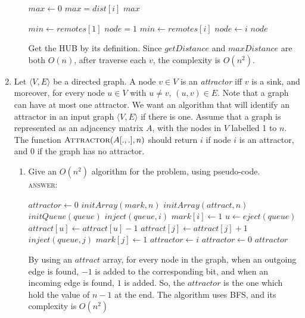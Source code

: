 \documentclass[11pt]{article}
\newcommand{\tuple}[1]{\langle #1 \rangle}
\begin{document}
\begin{enumerate}
\begin{enumerate}
\begin{algorithmic}
\State $max \gets 0$
    \State $max=dist[i]$
  \EndIf
\EndFor
\Return $max$
\EndFunction

\State $min \gets remotes[1]$
\State $node = 1$
    \State $min \gets remotes[i]$
    \State $node \gets i$
  \EndIf
\EndFor
\Return $node$
\EndFunction
\end{algorithmic}
Get the HUB by its definition.
Since $getDistance$ and $maxDistance$ are both $O(n)$,
after traverse each $v$, the complexity is $O(n^2)$.
\end{enumerate}

\item
Let $\tuple{V,E}$ be a directed graph.
A node $v \in V$ is an \emph{attractor} iff $v$ is a sink, and
moreover, for every node $u \in V$ with $u \not= v$, $(u,v) \in E$.
Note that a graph can have at most one attractor.
We want an algorithm that will identify an attractor in an
input graph $\tuple{V,E}$ if there is one.
Assume that a graph is represented as an adjacency matrix $A$,
with the nodes in $V$ labelled 1 to $n$.
The function $\textsc{Attractor}(A[.,.],n)$ should return $i$ if
node $i$ is an attractor, and 0 if the graph has no attractor.
\begin{enumerate}
\item
Give an $O(n^2)$ algorithm for the problem, using pseudo-code.
\\
\textsc{answer}:
\par
\begin{algorithmic}
\State $attractor \gets 0$
\State $initArray(mark, n)$
\State $initArray(attract, n)$
\State $initQueue(queue)$
    \State $inject(queue, i)$
    \State $mark[i] \gets 1$
      \State $u \gets eject(queue)$
          \State $attract[u] \gets attract[u]-1$
          \State $attract[j] \gets attract[j]+1$
            \State $inject(queue,j)$
            \State $mark[j] \gets 1$
          \EndIf
        \EndIf
      \EndFor
    \EndWhile
  \EndIf
\EndFor
{}
    \State $attractor \gets i$
  \EndIf
\EndFor
{}
  \State $attractor \gets 0$
\EndIf
\Return $attractor$
\EndFunction
\end{algorithmic}
By using an $attract$ array, for every node in the graph,
when an outgoing edge is found, $-1$ is added to the corresponding bit,
and when an incoming edge is found, $1$ is added.
So, the $attractor$ is the one which hold the value of $n-1$ at the end.
The algorithm uses BFS, and its complexity is $O(n^2)$


\end{enumerate}
\end{enumerate}
\end{document}
